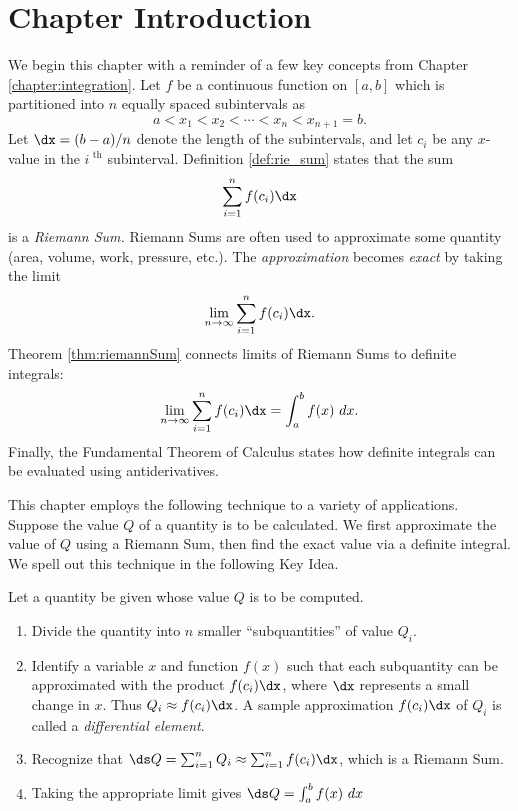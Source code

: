 \iflatexml\section*{Chapter Introduction}\fi

We begin this chapter with a reminder of a few key concepts from Chapter \ref{chapter:integration}. Let $f$ be a continuous function on $[a,b]$ which is partitioned into $n$ equally spaced subintervals as 
$$a<x_1 < x_2 < \cdots < x_n<x_{n+1}=b.$$ Let $\dx=(b-a)/n$ denote the length of the  subintervals, and let $c_i$ be any $x$-value in the $i^\text{ th}$ subinterval. Definition \ref{def:rie_sum} states that the sum $$\sum_{i=1}^n f(c_i)\dx$$ is a \textit{Riemann Sum.} Riemann Sums are often used to approximate some quantity (area, volume, work, pressure, etc.). The \textit{approximation} becomes \textit{exact} by taking the limit 
$$\lim_{n\to\infty} \sum_{i=1}^n f(c_i)\dx.$$ Theorem \ref{thm:riemannSum} connects limits of Riemann Sums to definite integrals:
$$\lim_{n\to\infty} \sum_{i=1}^n f(c_i)\dx = \int_a^b f(x)\ dx.$$ Finally, the Fundamental Theorem of Calculus states how definite integrals can be evaluated using antiderivatives. 

This chapter employs the following technique to a variety of applications. Suppose the value $Q$ of a quantity is to be calculated. We first approximate the value of $Q$ using a Riemann Sum, then find the exact value via a definite integral. We spell out this technique in the following Key Idea.
\enlargethispage{20\baselineskip}

{Let a quantity be given whose value $Q$ is to be computed.
\begin{enumerate}
\item		Divide the quantity into $n$ smaller ``subquantities'' of value $Q_i$.
\item		Identify a variable $x$ and function $f(x)$ such that each subquantity can be approximated with the product $f(c_i)\dx$, where $\dx$ represents a small change in $x$. Thus $Q_i \approx f(c_i)\dx$. A sample approximation $f(c_i)\dx$ of $Q_i$ is called a \textit{differential element}.
\item		Recognize that $\ds Q= \sum_{i=1}^n Q_i \approx \sum_{i=1}^n f(c_i)\dx$, which is a Riemann Sum.
\item		Taking the appropriate limit gives $\ds Q = \int_a^b f(x)\ dx$
\end{enumerate}
}
\restoreboxwidth

